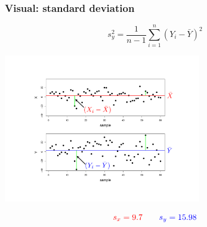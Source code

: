 \documentclass{beamer}
\begin{document}
\begin{frame}
\frametitle{Visual: standard deviation}

\vspace{-0.5cm}
$$
s^2_y =  \frac{1}{n-1}\sum^{n}_{i=1}{\left(Y_i - \bar{Y}\right)^2 }
$$

\vspace{-0.4cm}

\begin{center}
\includegraphics[width=3.4in]{figures/stdevpicnew.pdf}
\end{center}

\vspace{-1cm}

$$
{\color{red} s_x = 9.7} \quad \quad {\color{blue} s_y = 15.98}
$$

\end{frame}
\end{document}
